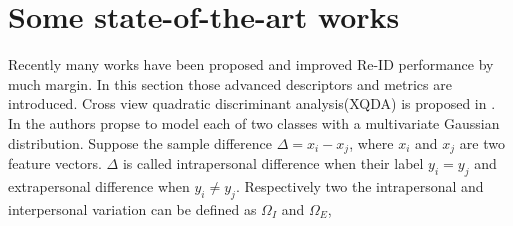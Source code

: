 \section{Some state-of-the-art works}
Recently many works have been proposed and improved Re-ID performance by much margin. In this section those advanced descriptors and metrics are introduced. Cross view quadratic discriminant analysis(XQDA) is proposed in \cite{LOMO}. In \cite{Bayeface} the authors propse to model each of two classes with a multivariate Gaussian  distribution. Suppose the sample difference $\Delta = x_i - x_j$, where $x_i$ and $x_j$ are two feature vectors. $\Delta$ is called intrapersonal difference when their label $y_i = y_j$ and extrapersonal difference when $y_i \ne y_j$. Respectively two the intrapersonal and interpersonal variation can be defined as $\Omega_I$ and $\Omega_E$,



